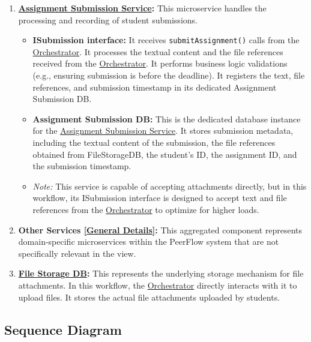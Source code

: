 \begin{enumerate}
    \item \textbf{\hyperref[def:AssignmentSubmissionService]{Assignment Submission Service}:} This microservice handles the processing and recording of student submissions. 
    \begin{itemize}
        \item \textbf{ISubmission interface:} It receives \texttt{submitAssignment()} calls from the \hyperref[def:Orchestrator]{Orchestrator}. It processes the textual content and the file references received from the \hyperref[def:Orchestrator]{Orchestrator}. It performs business logic validations (e.g., ensuring submission is before the deadline). It registers the text, file references, and submission timestamp in its dedicated Assignment Submission DB.
        
        \item \textbf{Assignment Submission DB:} This is the dedicated database instance for the \hyperref[def:AssignmentSubmissionService]{Assignment Submission Service}. It stores submission metadata, including the textual content of the submission, the file references obtained from FileStorageDB, the student's ID, the assignment ID, and the submission timestamp.
        
        \item \textit{Note:} This service is capable of accepting attachments directly, but in this workflow, its ISubmission interface is designed to accept text and file references from the \hyperref[def:Orchestrator]{Orchestrator} to optimize for higher loads.
    \end{itemize}

    \item \textbf{Other Services \hyperref[def:GenDetailsOtherServices]{[General Details]}:} This aggregated component represents domain-specific microservices within the PeerFlow system that are not specifically relevant in the view.

    \item \textbf{\hyperref[def:FileStorageService]{File Storage DB}:} This represents the underlying storage mechanism for file attachments. In this workflow, the \hyperref[def:Orchestrator]{Orchestrator} directly interacts with it to upload files. It stores the actual file attachments uploaded by students.
\end{enumerate}


\clearpage
\subsection{Sequence Diagram}

